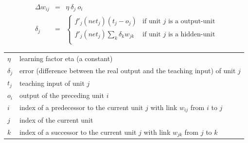 {\newpage
\clearpage
\samepage \begin{eqnarray*}\Delta w_{ij} & = & \eta \  \delta_{j} \  o_{i}\\ 
        \delta_{j}    & = & \left\{
        \begin{array}{ll}
        f'_{j}(net_{j})(t_{j} - o_{j}) &
        \mbox{if unit $j$ is a output-unit}\\ 
        f'_{j}(net_{j}) \sum_{k} \delta_{k} w_{jk} & 
         \mbox{if unit $j$ is a hidden-unit}\\ 
        \end{array}
        \right. 
\end{eqnarray*}
}

{\newpage
\clearpage
\samepage \begin{tabular}{ll}
        $\eta$        & learning factor eta (a constant)\\ 
        $\delta_{j}$  & error (difference between the real output and
                        the teaching input) of unit $j$\\ 
        $t_{j}$       & teaching input of unit $j$\\ 
        $o_{i}$       & output of the preceding unit $i$\\ 
        $i$           & index of a predecessor to the current unit $j$
                        with link $w_{ij}$ from $i$ to $j$\\ 
        $j$           & index of the current unit\\ 
        $k$           & index of a successor to the current unit $j$
                        with link $w_{jk}$ from $j$ to $k$\\ 
\end{tabular}
}

{\newpage
\clearpage
\samepage {}
}

{\newpage
\clearpage
\samepage \begin{figure}[htbp]
\begin{center}
  \begin{minipage}{\textwidth} 
  \end{minipage}

\label{overtraining}
\end{center}
\end{figure}
}

{\newpage
\clearpage
\samepage \begin{figure}[htbp]
\begin{center}
  \begin{minipage}{\textwidth}
  \end{minipage}

\label{picPatternMatcher}
\end{center}
\end{figure}
}


